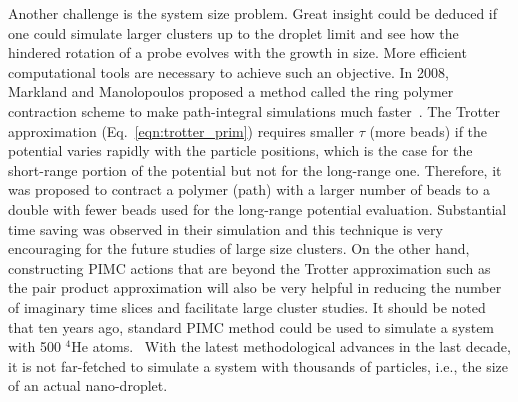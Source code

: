 \documentclass[12pt]{iopart}
\begin{document}
Another challenge is the system size problem. 
Great insight could be deduced if one could simulate larger clusters up to the droplet limit and see how the hindered rotation of a probe evolves with the growth in size. 
More efficient computational tools are necessary to achieve such an objective.
In 2008, Markland and Manolopoulos proposed a method called the ring polymer contraction scheme to make path-integral simulations much faster~\cite{markland_contraction,markland_contraction2}. 
The Trotter approximation (Eq.~\ref{eqn:trotter_prim}) requires smaller $\tau$ (more beads) if the potential varies rapidly with the particle positions, which is the case for the short-range portion of the potential but not for the long-range one. 
Therefore, it was proposed to contract a polymer (path) with a larger number of beads to a double with fewer beads used for the long-range potential evaluation. Substantial time saving was observed in their simulation and this technique is very encouraging for the future studies of large size clusters. On the other hand, constructing PIMC actions that are beyond the Trotter approximation such as the pair product approximation \cite{ceperley_rmp_1995} will also be very helpful in reducing the number of imaginary time slices and facilitate large cluster studies.
It should be noted that ten years ago, standard PIMC method could be used to simulate a system with 500 $^4$He atoms.~\cite{rho_fs_draeger} With the latest methodological advances in the last decade, it is not far-fetched to simulate a system with thousands of particles, i.e., the size of an actual nano-droplet.
\end{document}

